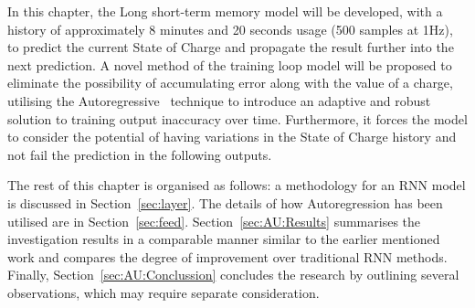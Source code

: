 %
%
In this chapter, the Long short-term memory model will be developed, with a history of approximately 8 minutes and 20 seconds usage (500 samples at 1Hz), to predict the current State of Charge and propagate the result further into the next prediction.
A novel method of the training loop model will be proposed to eliminate the possibility of accumulating error along with the value of a charge, utilising the Autoregressive~\cite{time_2020} technique to introduce an adaptive and robust solution to training output inaccuracy over time.
Furthermore, it forces the model to consider the potential of having variations in the State of Charge history and not fail the prediction in the following outputs.


%
%
%
%
The rest of this chapter is organised as follows: a methodology for an RNN model is discussed in Section~\ref{sec:layer}.
The details of how Autoregression has been utilised are in Section~\ref{sec:feed}.
Section~\ref{sec:AU:Results} summarises the investigation results in a comparable manner similar to the earlier mentioned work and compares the degree of improvement over traditional RNN methods.
Finally, Section~\ref{sec:AU:Conclussion} concludes the research by outlining several observations, which may require separate consideration.
